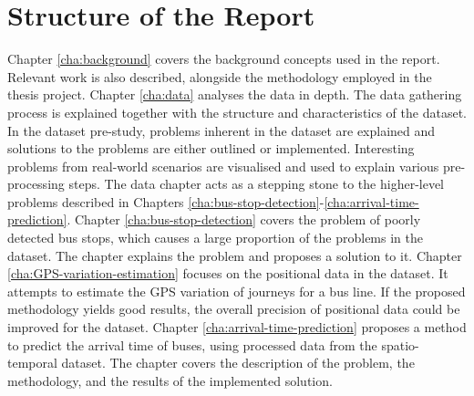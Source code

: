 \section{Structure of the Report}
Chapter \ref{cha:background} covers the background concepts used in the report.
Relevant work is also described, alongside the methodology employed in the thesis project.
Chapter \ref{cha:data} analyses the data in depth.
The data gathering process is explained together with the structure and characteristics of the dataset.
In the dataset pre-study, problems inherent in the dataset are explained and solutions to the problems are either outlined or implemented.
Interesting problems from real-world scenarios are visualised and used to explain various pre-processing steps.
The data chapter acts as a stepping stone to the higher-level problems described in Chapters \ref{cha:bus-stop-detection}-\ref{cha:arrival-time-prediction}.
Chapter \ref{cha:bus-stop-detection} covers the problem of poorly detected bus stops, which causes a large proportion of the problems in the dataset.
The chapter explains the problem and proposes a solution to it.
Chapter \ref{cha:GPS-variation-estimation} focuses on the positional data in the dataset.
It attempts to estimate the GPS variation of journeys for a bus line.
If the proposed methodology yields good results, the overall precision of positional data could be improved for the dataset.
Chapter \ref{cha:arrival-time-prediction} proposes a method to predict the arrival time of buses, using processed data from the spatio-temporal dataset.
The chapter covers the description of the problem, the methodology, and the results of the implemented solution.